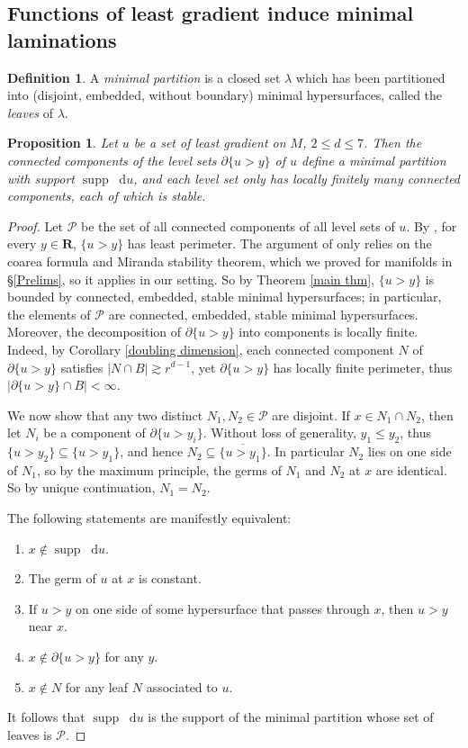\documentclass[reqno,11pt]{amsart}
\newcommand{\RR}{\mathbf{R}}
\DeclareMathOperator{\supp}{supp}
\newcommand*\dif{\mathop{}\!\mathrm{d}}
\newcommand{\dfn}[1]{\emph{#1}\index{#1}}
\newtheorem{proposition}[theorem]{Proposition}
\theoremstyle{definition}
\newtheorem{definition}[theorem]{Definition}
\numberwithin{equation}{section}
\begin{document}
\subsection{Functions of least gradient induce minimal laminations}

\begin{definition}
A \dfn{minimal partition} is a closed set $\lambda$ which has been partitioned into (disjoint, embedded, without boundary) minimal hypersurfaces, called the \dfn{leaves} of $\lambda$.
\end{definition}

\begin{proposition}\label{construction of minimal partitions}
Let $u$ be a set of least gradient on $M$, $2 \leq d \leq 7$.
Then the connected components of the level sets $\partial \{u > y\}$ of $u$ define a minimal partition with support $\supp \dif u$, and each level set only has locally finitely many connected components, each of which is stable.
\end{proposition}
\begin{proof}
Let $\mathscr P$ be the set of all connected components of all level sets of $u$.
By \cite[Theorem 1]{BOMBIERI1969}, for every $y \in \RR$, $\{u > y\}$ has least perimeter.
The argument of \cite{BOMBIERI1969} only relies on the coarea formula and Miranda stability theorem, which we proved for manifolds in \S\ref{Prelims}, so it applies in our setting.
So by Theorem \ref{main thm}, $\{u > y\}$ is bounded by connected, embedded, stable minimal hypersurfaces; in particular, the elements of $\mathscr P$ are connected, embedded, stable minimal hypersurfaces.
Moreover, the decomposition of $\partial \{u > y\}$ into components is locally finite.
Indeed, by Corollary \ref{doubling dimension}, each connected component $N$ of $\partial \{u > y\}$ satisfies $|N \cap B| \gtrsim r^{d - 1}$, yet $\partial \{u > y\}$ has locally finite perimeter, thus $|\partial \{u > y\} \cap B| < \infty$.

We now show that any two distinct $N_1, N_2 \in \mathscr P$ are disjoint.
If $x \in N_1 \cap N_2$, then let $N_i$ be a component of $\partial \{u > y_i\}$.
Without loss of generality, $y_1 \leq y_2$, thus $\{u > y_2\} \subseteq \{u > y_1\}$, and hence $N_2 \subseteq \overline{\{u > y_1\}}$.
In particular $N_2$ lies on one side of $N_1$, so by the maximum principle, the germs of $N_1$ and $N_2$ at $x$ are identical.
So by unique continuation, $N_1 = N_2$.

The following statements are manifestly equivalent:
\begin{enumerate}
\item $x \notin \supp \dif u$.
\item The germ of $u$ at $x$ is constant.
\item If $u > y$ on one side of some hypersurface that passes through $x$, then $u > y$ near $x$.
\item $x \notin \partial \{u > y\}$ for any $y$.
\item $x \notin N$ for any leaf $N$ associated to $u$.
\end{enumerate}
It follows that $\supp \dif u$ is the support of the minimal partition whose set of leaves is $\mathscr P$.
\end{proof}
\end{document}

